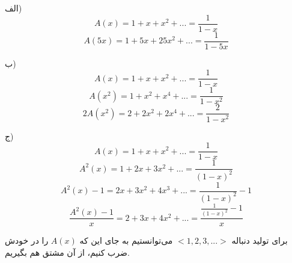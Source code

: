 الف)
$$ A(x) = 1 + x + x^2 + ... = \frac{1}{1 - x} $$
$$ A(5x) = 1 + 5x + 25x^2 + ... = \frac{1}{1 - 5x} $$

ب)
$$ A(x) = 1 + x + x^2 + ... = \frac{1}{1 - x} $$ 
$$ A(x^2) = 1 + x^2 + x^4 + ... = \frac{1}{1 - x^2} $$ 
$$ 2A(x^2) = 2 + 2x^2 + 2x^4 + ... = \frac{2}{1 - x^2}$$ 


ج)
$$ A(x) = 1 + x + x^2 + ... = \frac{1}{1 - x} $$ 
$$ A^2(x) = 1 + 2x + 3x^2 + ... = \frac{1}{(1 - x)^2}$$ 
$$ A^2(x) - 1 = 2x + 3x^2 + 4x^3 + ... = \frac{1}{(1 - x)^2} - 1$$
$$ \frac{A^2(x) - 1}{x} = 2 + 3x + 4x^2 + ... = \frac{\frac{1}{(1 - x)^2} - 1}{x}$$

برای تولید دنباله 
$<1, 2, 3, ...>$
می‌توانستیم به جای این که $A(x)$ را در خودش ضرب کنیم، از آن مشتق هم بگیریم.